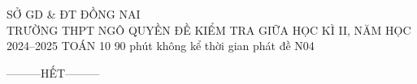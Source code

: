 \ExamInfo
    {SỞ GD \& ĐT ĐỒNG NAI\\TRƯỜNG THPT NGÔ QUYỀN}
    {ĐỀ KIỂM TRA GIỮA HỌC KÌ II, NĂM HỌC 2024--2025}
    {TOÁN 10}
    {90 phút}
    {không kể thời gian phát đề}
    {N04}

\MakeExamHeader






\begin{center}
---------HẾT---------
\end{center}
